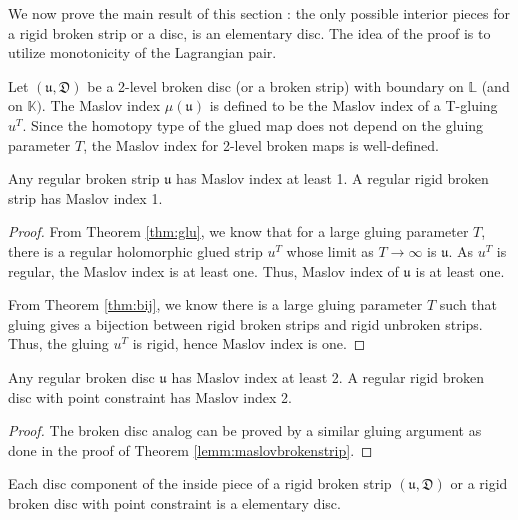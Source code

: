 We now prove the main result of this section : the only possible interior pieces for a rigid broken strip or a disc, is an elementary disc. The idea of the proof is to utilize monotonicity of the Lagrangian pair.



\begin{defn}
    Let $(\mathfrak{u,D})$ be a 2-level broken disc (or a broken strip) with boundary on $\mathbb L$  (and on $  \mathbb K)$. The Maslov index $\mu(\mathfrak u )$ is defined to be the Maslov index of a T-gluing $u^T$. Since the homotopy type of the glued map does not depend on the gluing parameter $T$, the Maslov index for 2-level broken maps is well-defined.  
    
\end{defn}

\begin{lemma}\label{lemm:maslovbrokenstrip}
    Any regular broken strip $\mathfrak u$ has Maslov index at least 1. A regular rigid broken strip has Maslov index 1.
\end{lemma}

\begin{proof}
    From Theorem \ref{thm:glu}, we know that for a large gluing parameter $T$, there is a regular holomorphic glued strip $u^T$ whose limit as $T\to \infty$ is $\mathfrak u$. As $u^T$ is regular, the Maslov index is at least one. Thus, Maslov index of $\mathfrak u$ is at least one.

    From Theorem \ref{thm:bij}, we know there is a large gluing parameter $T$ such that gluing gives a bijection between rigid broken strips and rigid unbroken strips. Thus, the gluing $u^T$ is rigid, hence Maslov index is one.
\end{proof}


\begin{lemma}\label{lemm:maslovbrokendisc}
    Any regular broken disc $\mathfrak u$ has Maslov index at least 2. A regular rigid broken disc with point constraint has Maslov index 2.
\end{lemma}
\begin{proof}
    
The broken disc analog can be proved by a similar gluing argument as done in the proof of Theorem \ref{lemm:maslovbrokenstrip}.
\end{proof}


\begin{Theorem}\label{lemm:onlysimple}
Each disc component of the inside piece of a rigid broken strip $\mathfrak{(u,D)}$ or a rigid broken disc with point constraint is a elementary disc.
\end{Theorem}


